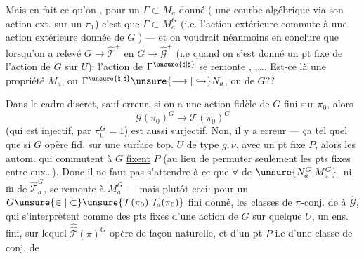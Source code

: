 Mais en fait ce qu'on , pour un $\Gamma\subset M_a$ donné ( une courbe algébrique via son action ext. sur un $\pi_1$) c'est que $\Gamma\subset M_a^G$ (i.e. l'action extérieure commute à une action extérieure donnée de $G$ ) --- et on voudrait néanmoins en conclure que lorsqu'on a relevé $G\longrightarrow\widehat{\mathcal T}^{+}$ en $G\longrightarrow\widehat{\mathcal G}^{+}$ (i.e quand on s'est donné un pt fixe de l'action de $G$ sur $U$):  l'action de $\Gamma^{\unsure{\natural|\sharp}}$ se remonte  ,   ,\ldots . Est-ce là une propriété  $M_a$, ou  $\Gamma^{\unsure{\natural|\sharp}}\unsure{\longrightarrow|\hookrightarrow}N_a$, ou de $G$??


Dans le cadre discret, sauf erreur, si on a une action fidèle  de $G$ fini sur $\pi_0$, alors 
\[
\mathcal G(\pi_0)^G\longrightarrow\mathcal T(\pi_0)^G
\]
(qui est injectif, par $\pi_0^G=1$) est aussi surjectif. Non, il y a erreur --- ça  tel quel que si $G$ opère fid. sur une surface top. $U$ de type $g,\nu$, avec un pt fixe $P$, alors les autom. qui commutent à $G$ \uline{fixent} $P$ (au lieu de permuter seulement les pts fixes entre eux\ldots). Donc il ne faut pas s'attendre à ce que $\forall$  de $\unsure{N_a^G|M_a^G}$, ni $\overline{\mathrm m}$ de $\widehat{\mathcal T}_a^G$, se remonte à $M_a^G$ --- mais plutôt ceci: pour un $G\unsure{\in|\subset}\unsure{\mathcal T(\pi_0)|\mathcal T_a(\pi_0)}$  fini donné, les classes de $\pi$-conj. de  à $\widehat{\mathcal G}$,  qui s'interprètent comme des pts fixes d'une action de $G$ sur quelque $U$,  un ens. fini, sur lequel $\widehat{\widehat{\mathcal T}}(\pi)^G$ opère de façon naturelle, et   d'un pt $P$ i.e d'une classe de conj. de 
